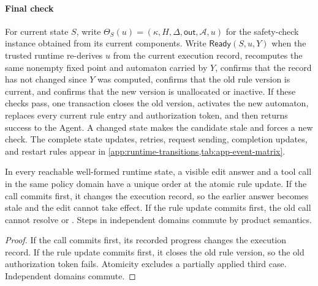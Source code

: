 \paragraph{Final check}
For current state \(S\), write
\(\Theta_S(u)=(\kappa,H,\Delta,\mathsf{out},\mathcal A,u)\)
for the safety-check instance obtained from its current components.
Write \(\mathsf{Ready}(S,u,Y)\) when the trusted runtime re-derives \(u\) from the current execution record, recomputes the same nonempty fixed point and automaton carried by \(Y\), confirms that the record has not changed since \(Y\) was computed, confirms that the old rule version is current, and confirms that the new version is unallocated or inactive.
If these checks pass, one transaction closes the old version, activates the new automaton, replaces every current rule entry and authorization token, and then returns success to the Agent.
A changed state makes the candidate stale and forces a new check.
The complete state updates, retries, request sending, completion updates, and restart rules appear in \cref{app:runtime-transitions,tab:app-event-matrix}.

\begin{lemma}
\label{lem:cut-linearization}
In every reachable well-formed runtime state, a visible edit answer and a tool call in the same policy domain have a unique order at the atomic rule update.
If the call commits first, it changes the execution record, so the earlier answer becomes stale and the edit cannot take effect.
If the rule update commits first, the old call cannot resolve \Fresh or \Alias.
Steps in independent domains commute by product semantics.
\end{lemma}
\begin{proof}
If the call commits first, its recorded progress changes the execution record.
If the rule update commits first, it closes the old rule version, so the old authorization token fails.
Atomicity excludes a partially applied third case.
Independent domains commute.
\end{proof}

